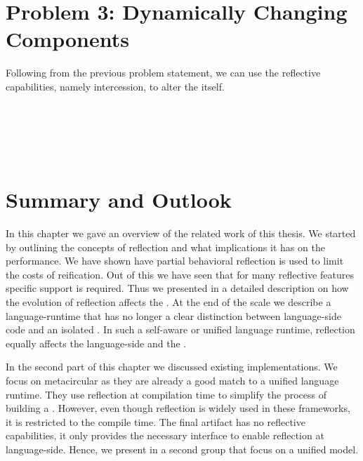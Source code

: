 \section{Problem 3: Dynamically Changing \VM Components}
Following from the previous problem statement, we can use the reflective capabilities, namely intercession, to alter the \VM itself.

\\
\\
\\
\\


\section{Summary and Outlook}

In this chapter we gave an overview of the related work of this thesis.
We started by outlining the concepts of reflection and what implications it has on the performance.
We have shown have partial behavioral reflection is used to limit the costs of reification.
Out of this we have seen that for many reflective features specific \VM support is required.
Thus we presented in  a detailed description on how the evolution of reflection affects the \VM.
At the end of the scale we describe a language-runtime that has no longer a clear distinction between language-side code and an isolated \VM.
In such a self-aware \VM or unified language runtime, reflection equally affects the language-side and the \VM.

In the second part of this chapter we discussed existing \VM implementations.
We focus on metacircular \VMs as they are already a good match to a unified language runtime.
They use reflection at compilation time to simplify the process of building a \VM.
However, even though reflection is widely used in these frameworks, it is restricted to the compile time.
The final \VM artifact has no reflective capabilities, it only provides the necessary interface to enable reflection at language-side.
Hence, we present in a second group \VMs that focus on a unified model.


